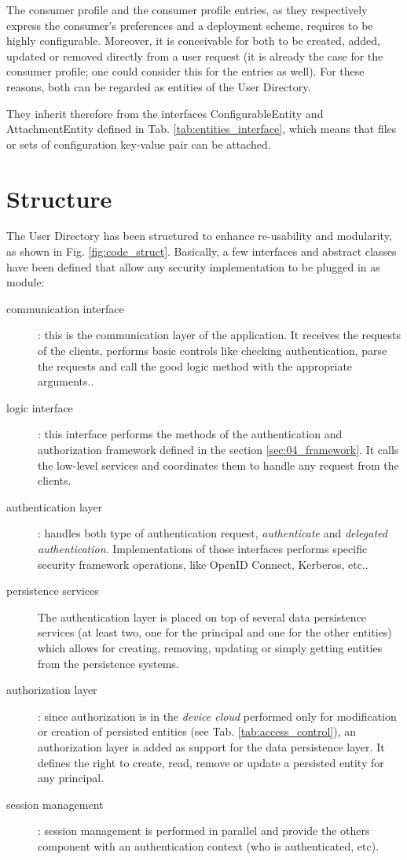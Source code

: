The consumer profile and the consumer profile entries, as they respectively express the consumer's preferences and a deployment scheme, requires to be highly configurable. Moreover, it is conceivable for both to be created, added, updated or removed directly from a user request (it is already the case for the consumer profile; one could consider this for the entries as well). For these reasons, both can be regarded as entities of the User Directory.

They inherit therefore from the interfaces ConfigurableEntity and AttachmentEntity defined in Tab. \ref{tab:entities_interface}, which means that files or sets of configuration key-value pair can be attached.

\section{Structure}
The User Directory has been structured to enhance re-usability and modularity, as shown in Fig. \ref{fig:code_struct}. Basically, a few interfaces and abstract classes have been defined that allow any security implementation to be plugged in as module:

\begin{description}
	\item[communication interface]: this is the communication layer of the application. It receives the requests of the clients, performs basic controls like checking authentication, parse the requests and call the good logic method with the appropriate arguments..\\
	\item[logic interface]: this interface performs the methods of the authentication and authorization framework defined  in the section \ref{sec:04_framework}. It calls the low-level services and coordinates them to handle any request from the clients.\\
	\item[authentication layer]: handles both type of authentication request, \textit{authenticate} and \textit{delegated authentication}. Implementations of those interfaces performs specific security framework operations, like OpenID Connect, Kerberos, etc..\\
	\item[persistence services] The authentication layer is placed on top of several data persistence services (at least two, one for the principal and one for the other entities) which allows for creating, removing, updating or simply getting entities from the persistence systems.
	\item[authorization layer]: since authorization is in the \emph{device cloud} performed only for modification or creation of persisted entities (see Tab. \ref{tab:access_control}), an authorization layer is added as support for the data persistence layer. It defines the right to create, read, remove or update a persisted entity for any principal. \\
	\item[session management]: session management is performed in parallel and provide the others component with an authentication context (who is authenticated, etc).
\end{description}


